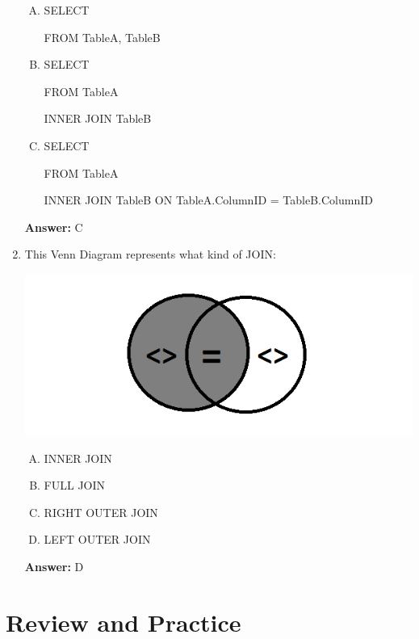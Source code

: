 \documentclass[12pt]{article}
\begin{document}
\begin{enumerate}[1.]
    \begin{enumerate}[A.]
        \item
        SELECT \*

        FROM TableA, TableB

        \item
        SELECT \*

        FROM TableA

        INNER JOIN TableB

        \item
        SELECT \*

        FROM TableA

        INNER JOIN TableB ON TableA.ColumnID = TableB.ColumnID

    \end{enumerate}

    \bigskip

    \textbf{Answer:} C

    \item

    This Venn Diagram represents what kind of JOIN:

    \bigskip

    \begin{center}
    \includegraphics[width=\linewidth]{images/part_4_notes_10.png}
    \end{center}

    \bigskip

    \begin{enumerate}[A.]
        \item INNER JOIN
        \item FULL JOIN
        \item RIGHT OUTER JOIN
        \item LEFT OUTER JOIN
    \end{enumerate}

    \bigskip

    \textbf{Answer:} D

\end{enumerate}


\bigskip

\section{Review and Practice}

\bigskip
\end{document}
